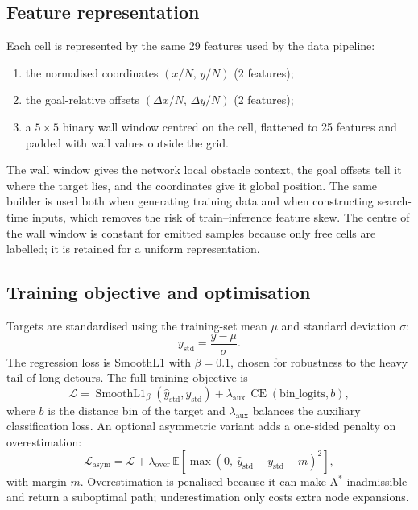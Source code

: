 \documentclass[11pt]{article}
\begin{document}
\subsection{Feature representation}
Each cell is represented by the same 29 features used by the data pipeline:
\begin{enumerate}
  \item the normalised coordinates $(x/N,\,y/N)$ (2 features);
  \item the goal-relative offsets $(\Delta x/N,\,\Delta y/N)$ (2 features);
  \item a $5\times5$ binary wall window centred on the cell, flattened to 25
  features and padded with wall values outside the grid.
\end{enumerate}
The wall window gives the network local obstacle context, the goal offsets tell
it where the target lies, and the coordinates give it global position. The same
builder is used both when generating training data and when constructing
search-time inputs, which removes the risk of train--inference feature skew.
The centre of the wall window is constant for emitted samples because only free
cells are labelled; it is retained for a uniform representation.

\subsection{Training objective and optimisation}
Targets are standardised using the training-set mean $\mu$ and standard
deviation $\sigma$:
\begin{equation}
  y_{\text{std}} = \frac{y-\mu}{\sigma}.
\end{equation}
The regression loss is SmoothL1 with $\beta=0.1$, chosen for robustness to the
heavy tail of long detours. The full training objective is
\begin{equation}
  \mathcal{L}
  = \operatorname{SmoothL1}_\beta(\hat{y}_{\text{std}}, y_{\text{std}})
  + \lambda_{\text{aux}}\,\operatorname{CE}(\text{bin\_logits}, b),
\end{equation}
where $b$ is the distance bin of the target and $\lambda_{\text{aux}}$ balances
the auxiliary classification loss. An optional asymmetric variant adds a
one-sided penalty on overestimation:
\begin{equation}
  \mathcal{L}_{\text{asym}}
  = \mathcal{L}
  + \lambda_{\text{over}}\,\mathbb{E}\!\left[
      \max(0,\ \hat{y}_{\text{std}} - y_{\text{std}} - m)^2
    \right],
\end{equation}
with margin $m$. Overestimation is penalised because it can make A$^\ast$
inadmissible and return a suboptimal path; underestimation only costs extra
node expansions.
\end{document}
